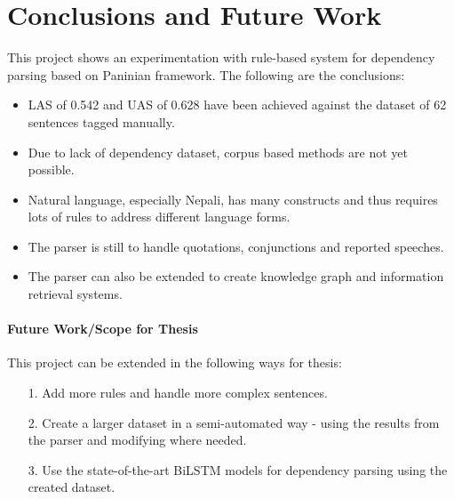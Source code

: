 \chapter{Conclusions and Future Work}
This project shows an experimentation with rule-based system for dependency
parsing based on Paninian framework. The following are the conclusions:
\begin{itemize}
    \item LAS of 0.542 and UAS of 0.628 have been achieved against the dataset of 62 sentences tagged manually.
    \item Due to lack of dependency dataset, corpus based methods are not yet possible.
    \item Natural language, especially Nepali, has many constructs and thus requires lots of rules to address different language forms.
    \item The parser is still to handle quotations, conjunctions and reported speeches.
    \item The parser can also be extended to create knowledge graph and information retrieval systems.
\end{itemize}

\subsubsection{Future Work/Scope for Thesis}
This project can be extended in the following ways for thesis:
\begin{itemize}
    \item[1.] Add more rules and handle more complex sentences.
    \item[2.] Create a larger dataset in a semi-automated way - using the results from the parser and modifying where needed.
    \item[3.] Use the state-of-the-art BiLSTM models for dependency parsing using the created dataset.
\end{itemize}


